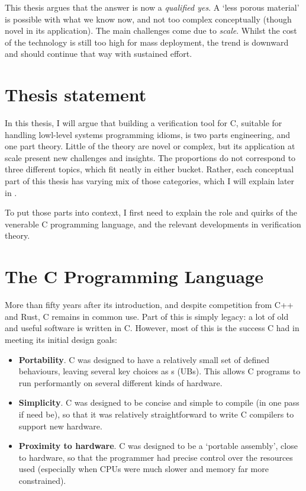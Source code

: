 This thesis argues that the answer is now a \emph{qualified yes}. A `less
porous material' is possible with what we know now, and not too complex
conceptually (though novel in its application). The main challenges come due to
\emph{scale}. Whilst the cost of the technology is still too high for mass
deployment, the trend is downward and should continue that way with sustained
effort.


\section{Thesis statement}

In this thesis, I will argue that building a verification tool for C, suitable
for handling lowl-level systems programming idioms, is two parts engineering,
and one part theory. Little of the theory are novel or complex, but its
application at scale present new challenges and insights. The proportions do
not correspond to three different topics, which fit neatly in either bucket.
Rather, each conceptual part of this thesis has varying mix of those
categories, which I will explain later in .

To put those parts into context, I first need to explain the role and quirks of
the venerable C programming language, and the relevant developments in
verification theory.

\section{The C Programming Language}

More than fifty years after its introduction, and despite competition from
C++ and Rust, C remains in common use. Part
of this is simply legacy: a lot of old and useful software is written in C.
However, most of this is the success C had in meeting its initial design goals:

\begin{itemize}
    \item \textbf{Portability}. C was designed to have a relatively small set
        of defined behaviours, leaving several key choices as
        s (UBs). This allows C programs to run
        performantly on several different kinds of hardware.
    \item \textbf{Simplicity}. C was designed to be concise and simple to
        compile (in one pass if need be), so that it was relatively
        straightforward to write C compilers to support new hardware.
    \item \textbf{Proximity to hardware}. C was designed to be a `portable
        assembly', close to hardware, so that the programmer had precise
        control over the resources used (especially when CPUs were much slower
        and memory far more constrained).
\end{itemize}

